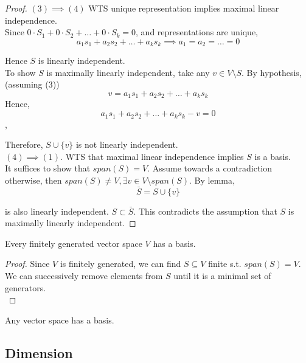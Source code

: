 \begin{proof}
$(3) \implies (4)$ WTS unique representation implies maximal linear independence. \\

Since $0 \cdot S_1 + 0 \cdot S_2 + \hdots + 0 \cdot S_k = 0$, and representations are unique, 
\[
  a_1 s_1 + a_2 s_2 + \hdots + a_k s_k \implies a_1 = a_2 = \hdots = 0
\]

Hence $S$ is linearly independent. \\

To show $S$ is maximally linearly independent, take any $v \in V \setminus S $. By hypothesis, (assuming (3))
\[
  v = a_1 s_ 1 + a_2 s_2 + \hdots + a_k s_k
\]
Hence,
\[
  a_1 s_ 1 + a_2 s_2 + \hdots + a_k s_k - v = 0
\],

Therefore, $S \cup \{ v \} $ is not linearly independent. \\

$(4) \implies (1)$. WTS that maximal linear independence implies $S$ is a basis. \\

It suffices to show that $span(S) = V$. Assume towards a contradiction otherwise, then $span(S) \neq V, \exists v \in V \setminus span(S)$. By lemma, 
\[
  \bar{S}  = S \cup \{ v \} 
\]

is also linearly independent. $S \subset \bar{S} $. This contradicts the assumption that $S$ is maximally linearly independent.
\end{proof}

\begin{corollary}
Every finitely generated vector space $V$ has a basis.
\end{corollary} 

\begin{proof}
Since $V$ is finitely generated, we can find $S \subseteq V$ finite s.t. $span(S) = V$. \\

We can successively remove elements from $S$ until it is a minimal set of generators.  \\
\end{proof}

\begin{remark}
Any vector space has a basis. 
\end{remark}



\subsection{Dimension}

